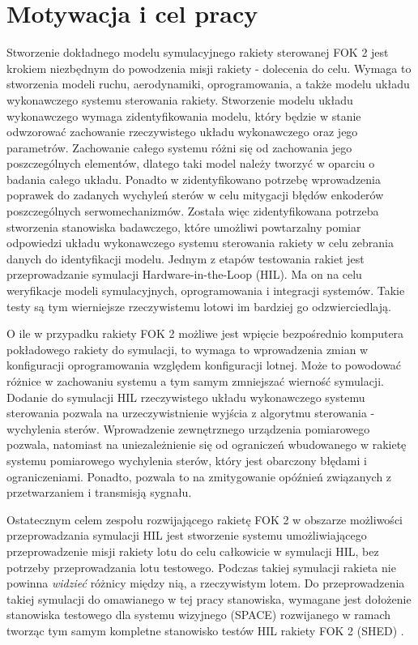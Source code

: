 \section{Motywacja i cel pracy}
\label{sec:motywacja}
Stworzenie dokładnego modelu symulacyjnego rakiety sterowanej FOK 2
jest krokiem niezbędnym do powodzenia misji rakiety - dolecenia do celu.
Wymaga to stworzenia modeli ruchu, aerodynamiki, oprogramowania, a także modelu układu wykonawczego systemu sterowania rakiety.
Stworzenie modelu układu wykonawczego wymaga zidentyfikowania modelu, który będzie w stanie odwzorować zachowanie rzeczywistego układu wykonawczego
oraz jego parametrów. Zachowanie całego systemu różni się od zachowania jego poszczególnych elementów, dlatego taki model należy tworzyć w oparciu o badania całego układu.
Ponadto w \cite{olgierd} zidentyfikowano potrzebę wprowadzenia poprawek do zadanych wychyleń sterów w celu mitygacji błędów enkoderów poszczególnych serwomechanizmów.
Została więc zidentyfikowana potrzeba stworzenia stanowiska badawczego, które umożliwi 
powtarzalny pomiar odpowiedzi układu wykonawczego systemu sterowania rakiety w celu zebrania 
danych do identyfikacji modelu.
Jednym z etapów testowania rakiet jest przeprowadzanie symulacji Hardware-in-the-Loop (HIL).
Ma on na celu weryfikacje modeli symulacyjnych, oprogramowania i integracji systemów. 
Takie testy są tym wierniejsze rzeczywistemu lotowi im bardziej go odzwierciedlają.

O ile w przypadku rakiety FOK 2 możliwe jest wpięcie bezpośrednio komputera pokładowego
rakiety do symulacji, to wymaga to wprowadzenia zmian w konfiguracji oprogramowania względem konfiguracji lotnej.
Może to powodować różnice w zachowaniu systemu a tym samym zmniejszać wierność symulacji.
Dodanie do symulacji HIL rzeczywistego układu wykonawczego systemu sterowania pozwala 
na urzeczywistnienie wyjścia z algorytmu sterowania - wychylenia sterów. Wprowadzenie 
zewnętrznego urządzenia pomiarowego pozwala, natomiast na uniezależnienie się od ograniczeń
wbudowanego w rakietę systemu pomiarowego wychylenia sterów, który jest obarczony błędami 
i ograniczeniami. Ponadto, pozwala to na zmitygowanie opóźnień związanych z przetwarzaniem i transmisją sygnału.

Ostatecznym celem zespołu rozwijającego rakietę FOK 2 w obszarze możliwości przeprowadzania 
symulacji HIL jest stworzenie systemu umożliwiającego przeprowadzenie misji rakiety lotu do celu
całkowicie w symulacji HIL, bez potrzeby przeprowadzania lotu testowego. Podczas takiej symulacji
rakieta nie powinna \textit{widzieć} różnicy między nią, a rzeczywistym lotem. Do przeprowadzenia 
takiej symulacji do omawianego w tej pracy stanowiska, wymagane jest dołożenie 
stanowiska testowego dla systemu wizyjnego (SPACE) rozwijanego w ramach \cite{Skromak2025HITL}
tworząc tym samym kompletne stanowisko testów HIL rakiety FOK 2 (SHED) \cite{skromak2026hilall}.


